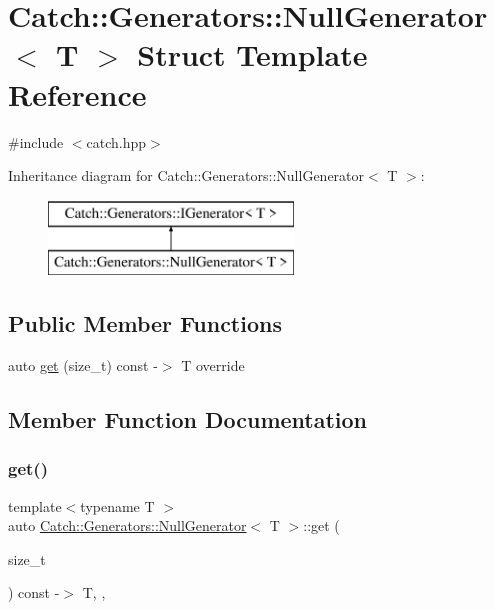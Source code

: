 \hypertarget{struct_catch_1_1_generators_1_1_null_generator}{}\section{Catch\+:\+:Generators\+:\+:Null\+Generator$<$ T $>$ Struct Template Reference}
\label{struct_catch_1_1_generators_1_1_null_generator}


{\ttfamily \#include $<$catch.\+hpp$>$}

Inheritance diagram for Catch\+:\+:Generators\+:\+:Null\+Generator$<$ T $>$\+:\begin{figure}[H]
\begin{center}
\leavevmode
\includegraphics[height=2.000000cm]{struct_catch_1_1_generators_1_1_null_generator}
\end{center}
\end{figure}
\subsection*{Public Member Functions}
\begin{DoxyCompactItemize}
\item 
auto \mbox{\hyperlink{struct_catch_1_1_generators_1_1_null_generator_a17a2cc82d644e97afded4017c7a062ef}{get}} (size\+\_\+t) const -\/$>$ T override
\end{DoxyCompactItemize}


\subsection{Member Function Documentation}
\mbox{\label{struct_catch_1_1_generators_1_1_null_generator_a17a2cc82d644e97afded4017c7a062ef}} 
\subsubsection{\texorpdfstring{get()}{get()}}
{\footnotesize\ttfamily template$<$typename T $>$ \\
auto \mbox{\hyperlink{struct_catch_1_1_generators_1_1_null_generator}{Catch\+::\+Generators\+::\+Null\+Generator}}$<$ T $>$\+::get (\begin{DoxyParamCaption}\item[{size\+\_\+t}]{ }\end{DoxyParamCaption}) const -\/$>$ T\hspace{0.3cm}{\ttfamily [inline]}, {\ttfamily [override]}, {\ttfamily [virtual]}}



